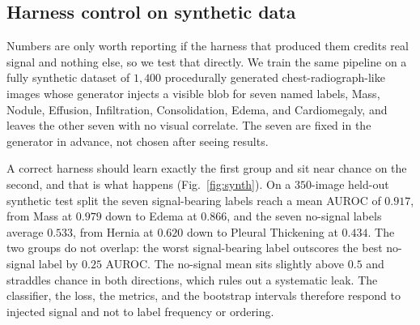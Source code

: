\documentclass[conference]{IEEEtran}
\begin{document}
\subsection{Harness control on synthetic data}
\label{sec:synthetic}
Numbers are only worth reporting if the harness that produced them credits real
signal and nothing else, so we test that directly. We train the same pipeline on a
fully synthetic dataset of $1{,}400$ procedurally generated chest-radiograph-like
images whose generator injects a visible blob for seven named labels, Mass, Nodule,
Effusion, Infiltration, Consolidation, Edema, and Cardiomegaly, and leaves the
other seven with no visual correlate. The seven are fixed in the generator in
advance, not chosen after seeing results.

A correct harness should learn exactly the first group and sit near chance on the
second, and that is what happens (Fig.~\ref{fig:synth}). On a $350$-image held-out
synthetic test split the seven signal-bearing labels reach a mean AUROC of $0.917$,
from Mass at $0.979$ down to Edema at $0.866$, and the seven no-signal labels
average $0.533$, from Hernia at $0.620$ down to Pleural Thickening at $0.434$. The
two groups do not overlap: the worst signal-bearing label outscores the best
no-signal label by $0.25$ AUROC. The no-signal mean sits slightly above $0.5$ and
straddles chance in both directions, which rules out a systematic leak. The
classifier, the loss, the metrics, and the bootstrap intervals therefore respond to
injected signal and not to label frequency or ordering.
\end{document}
